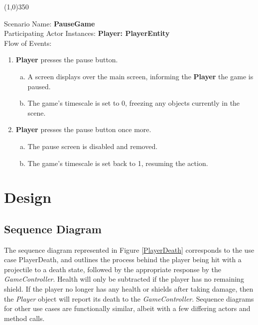 \documentclass[12pt]{article}       %
\begin{document}
\begin{center} \line(1,0){350} \end{center}
Scenario Name: {\bf PauseGame} \\
Participating Actor Instances:        \hspace{46pt} {\bf Player: PlayerEntity }  \vspace{10pt}  \\ 
Flow of Events: 
\begin{enumerate} 
\item {\bf Player} presses the pause button.
	\begin{enumerate} [a.]
	\item A screen displays over the main screen, informing the {\bf Player} the game is paused.
	\item The game's timescale is set to 0, freezing any objects currently in the scene.
	\end{enumerate}
\item {\bf Player} presses the pause button once more. 
	\begin{enumerate} [a.]
	\item The pause screen is disabled and removed.
	\item The game's timescale is set back to 1, resuming the action.
	\end{enumerate}
\end{enumerate}


\section{Design} %
\label{sec:Design}

\subsection{Sequence Diagram}
The sequence diagram represented in Figure \ref{PlayerDeath}  corresponds to the use case PlayerDeath, and outlines the process behind the player being hit with a projectile to a death state, followed by the appropriate response by the {\it GameController}. Health will only be subtracted if the player has no remaining shield. If the player no longer has any health or shields after taking damage, then the {\it Player} object will report its death to the {\it GameController}. Sequence diagrams for other use cases are functionally similar, albeit with a few differing actors and method calls.
\end{document}

